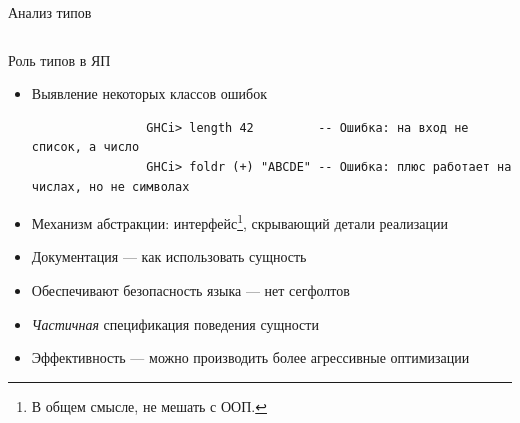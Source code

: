 \begin{frame}{Анализ типов}
\begin{columns}[onlytextwidth]
\begin{column}[t]{0.62\textwidth}
                \begin{center}
                \end{center}
            \end{column}
        \end{columns}
    \end{frame}

    \begin{frame}[fragile]{Роль типов в ЯП}
        \begin{itemize}
            \item Выявление некоторых классов ошибок
            \begin{verbatim}
                GHCi> length 42         -- Ошибка: на вход не список, а число
                GHCi> foldr (+) "ABCDE" -- Ошибка: плюс работает на числах, но не символах
            \end{verbatim}
            \item Механизм абстракции: интерфейс\footnote{В общем смысле, не мешать с ООП.}, скрывающий детали реализации
            \item Документация --- как использовать сущность
            \item Обеспечивают безопасность языка --- нет сегфолтов
            \item \textit{Частичная} спецификация поведения сущности
            \item Эффективность --- можно производить более агрессивные оптимизации
        \end{itemize}
    \end{frame}

